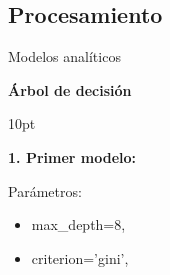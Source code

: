 \documentclass[pdf]{beamer}
\def\vspace{}%
\begin{document}
{        \subsection{Procesamiento}
%
%
%    
%        
%
%
%
%
        
\begin{frame}{Modelos analíticos}
    \begin{Large}
        \textbf{Árbol de decisión}
    \end{Large}
    \vspace{10pt}

     \textbf{1. Primer modelo:}

    Parámetros:
    \begin{itemize}
        \item max\_depth=8,
        \item criterion='gini',
    \end{itemize}
    

\end{frame}}
\end{document}
